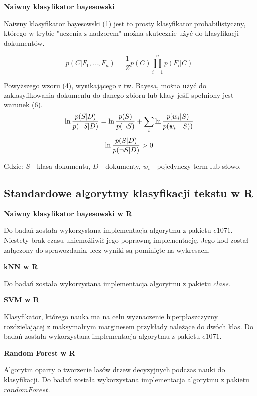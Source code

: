\documentclass[a4paper, 10pt]{article}
\begin{document}
{\bf{Naiwny klasyfikator bayesowski}}

Naiwny klasyfikator bayesowski (1) jest to prosty klasyfikator probabilistyczny, którego w trybie "uczenia z nadzorem" można skutecznie użyć do 
klasyfikacji dokumentów.

\begin{equation}
p(C \vert F_1,\dots,F_n) = \frac{1}{Z}  p(C) \prod_{i=1}^n p(F_i \vert C)
\end{equation}

Powyższego wzoru (4), wynikającego z tw. Bayesa, można użyć do zaklasyfikowania dokumentu do danego zbioru lub klasy jeśli spełniony jest warunek (6).
\begin{equation}
\ln{p(S\vert D)\over p(\neg S\vert D)}=\ln{p(S)\over p(\neg S)}+\sum_i \ln{p(w_i\vert S)\over p(w_i\vert\neg S))}
\end{equation}
\begin{equation}
\ln{p(S\vert D)\over p(\neg S\vert D)} > 0
\end{equation}

Gdzie: $S$ - klasa dokumentu, $D$ - dokumenty, $w_i$ - pojedynczy term lub słowo.
	

	\subsection{Standardowe algorytmy klasyfikacji tekstu w R}
	
	{\bf{Naiwny klasyfikator bayesowski w R}}
	
	Do badań została wykorzystana implementacja algorytmu z pakietu $e1071$. Niestety brak czasu uniemożliwił jego poprawną implementację. Jego kod został załączony 
	do sprawozdania, lecz wyniki są pominięte na wykresach.
	
	
	{\bf{kNN w R}}
	
	Do badań została wykorzystana implementacja algorytmu z pakietu $class$.
	
	{\bf{SVM w R}}
	
	Klasyfikator, którego nauka ma na celu wyznaczenie hiperpłaszczyzny rozdzielającej z maksymalnym marginesem przykłady należące do dwóch klas.
	Do badań została wykorzystana implementacja algorytmu z pakietu $e1071$.
	
	{\bf{Random Forest w R}}
	
	Algorytm oparty o tworzenie lasów drzew decyzyjnych podczas nauki do klasyfikacji. Do badań została wykorzystana implementacja algorytmu z pakietu $randomForest$.
	
	
\end{document}

